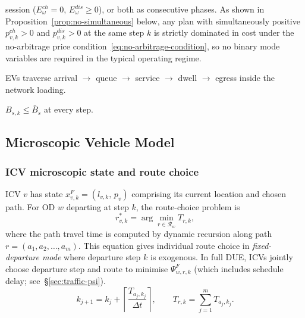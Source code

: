 \begin{description}
    session ($E^{ch}_\omega = 0$, $E^{dis}_\omega \ge 0$), or both
    as consecutive phases.  As shown in
    Proposition~\ref{prop:no-simultaneous} below, any plan with
    simultaneously positive $p^{ch}_{v,k} > 0$ and
    $p^{dis}_{v,k} > 0$ at the same step $k$ is strictly dominated in
    cost under the no-arbitrage price
    condition~\eqref{eq:no-arbitrage-condition}, so no binary mode
    variables are required in the typical operating regime.
  \item[\textbf{A11} (Station as service node).] EVs traverse
    arrival $\to$ queue $\to$ service $\to$ dwell $\to$ egress
    inside the network loading.
  \item[\textbf{A12} (Plug capacity).] $B_{s,k} \le \bar{B}_s$
    at every step.
\end{description}

\subsection{Microscopic Vehicle Model}
\label{sec:traffic-micro}

\subsubsection{ICV microscopic state and route choice}

ICV $v$ has state $x^F_{v,k} = (l_{v,k},\, p_v)$ comprising its current
location and chosen path.  For OD $w$ departing at step $k$, the
route-choice problem is
\begin{equation}
  r^*_{v,k} = \arg\min_{r \in \mathcal{R}_w} T_{r,k},
  \label{eq:icv-route-choice}
\end{equation}
where the path travel time is computed by dynamic recursion along
path $r = (a_1, a_2, \ldots, a_m)$.  This equation gives individual
route choice in \emph{fixed-departure mode} where departure step $k$ is
exogenous.  In full DUE, ICVs jointly choose departure step and route to
minimise $\Psi^F_{w,r,k}$ (which includes schedule delay;
see~\S\ref{sec:traffic-psi}).
\begin{equation}
  k_{j+1} = k_j + \left\lceil \frac{T_{a_j, k_j}}{\Delta t} \right\rceil,
  \qquad
  T_{r,k} = \sum_{j=1}^{m} T_{a_j, k_j}.
  \label{eq:path-tt-recursion}
\end{equation}

